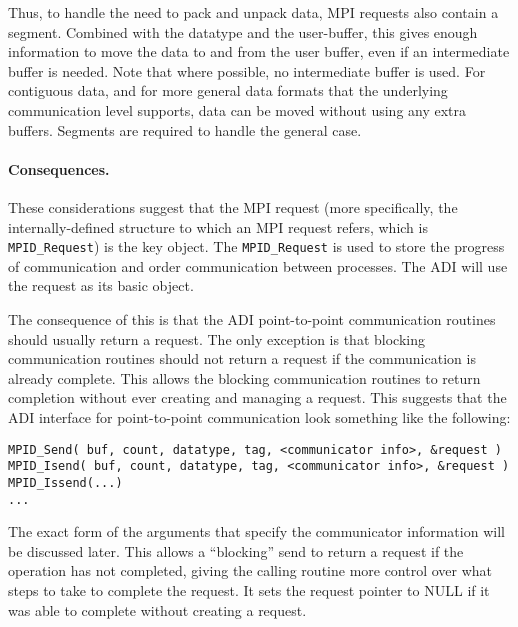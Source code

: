 \documentclass{article}
\def\code#1{\texttt{#1}}
\begin{document}
Thus, to handle the need to pack and unpack data, MPI requests also
contain a segment.  Combined with the datatype and the user-buffer,
this gives enough information to move the data to and from the user
buffer, even if an intermediate buffer is needed.  Note that where
possible, no intermediate buffer is used.  For contiguous data, and
for more general data formats that the underlying communication level
supports, data can be moved without using any extra buffers.  Segments
are required to handle the general case.  

\paragraph{Consequences.}
These considerations suggest that the MPI request (more
specifically, the internally-defined structure to which an MPI
request refers, which is \code{MPID_Request}) is the key object.  The
\code{MPID_Request} is used to store the progress of communication and
order communication between processes.  The ADI will use the request
as its basic object.

The
consequence of this is that the ADI point-to-point communication routines
should usually return a request.  The only exception is that blocking
communication routines should not return a request if the
communication is already complete.  This allows
the blocking communication routines to
return completion without ever creating and managing a request.
This suggests that the ADI interface for point-to-point communication
look something like the following: 

\begin{small}
\begin{verbatim}
MPID_Send( buf, count, datatype, tag, <communicator info>, &request )
MPID_Isend( buf, count, datatype, tag, <communicator info>, &request )
MPID_Issend(...)
... 
\end{verbatim}
\end{small}

\noindent
The exact form of the arguments that specify the communicator
information will be discussed later.
This allows a ``blocking'' send to return a request if the operation
has not completed, giving the calling routine more control over
what steps to take to complete the request.  It sets the request
pointer to NULL if it was able to complete without creating a request.

\end{document}
